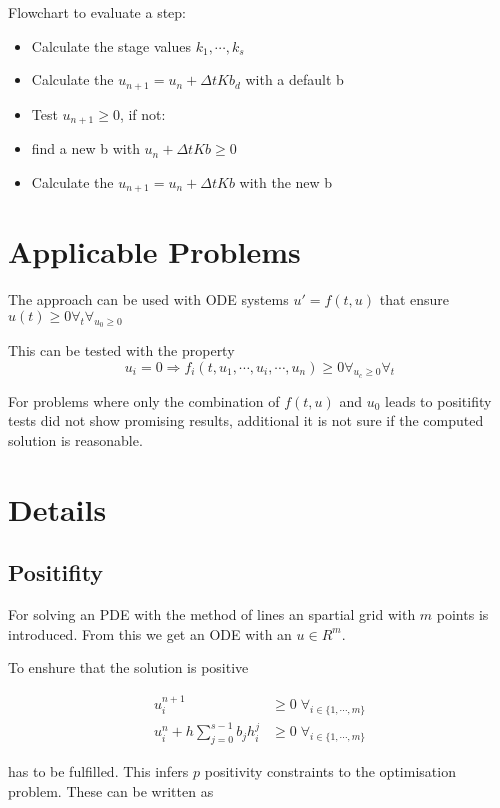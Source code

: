 \documentclass{article}
\begin{document}
Flowchart to evaluate a step:

\begin{itemize}
\item Calculate the stage values $k_1,\cdots,k_s$
\item Calculate the $u_{n+1} = u_n + \Delta t K b_{d}$ with a default b
\item Test $u_{n+1} \geq 0$, if not:
\item find a new b with $u_n + \Delta t K b \geq 0$
\item Calculate the $u_{n+1} = u_n + \Delta t K b$ with the new b
\end{itemize}


\section{Applicable Problems}
The approach can be used with ODE systems $u' = f(t,u)$ that ensure  $u(t) \geq 0 \forall_t \forall_{  u_0 \geq 0}$ 

This can be tested with the property 
\begin{equation}
u_i=0 \Rightarrow f_i(t,u_1,\cdots,u_i,\cdots,u_n) \geq 0  \forall_{u_c \geq 0} \forall_{t}
\end{equation}

For problems where only the combination of $f(t,u)$ and $u_0$ leads to positifity tests did not show promising results, additional it is not sure if the computed solution is reasonable.

\section{Details}

\subsection{Positifity}
For solving an PDE with the method of lines an spartial grid  with $m$ points is introduced. 
From this we get an ODE with an $u \in R^m$.

To enshure that the solution is positive 

\begin{align}
 u_i^{n+1} &\geq 0   \;   \forall_{i \in \{1, \cdots,m \}}  \\
 u_i^n + h \sum_{j=0}^{s-1} b_j h_i^j  &\geq 0   \;   \forall_{i \in \{1,\cdots,m \}}  
\end{align}

has to be fulfilled.
This infers $p$ positivity constraints to the optimisation problem. These can be written as
\end{document}
